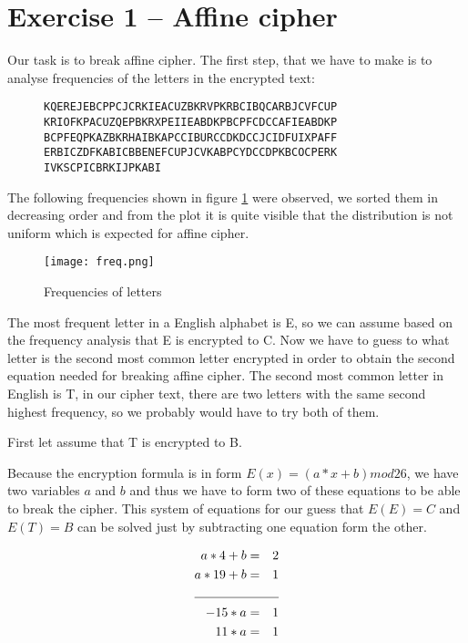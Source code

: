 \documentclass[a4paper,10pt]{article}
\begin{document}
\section*{Exercise 1 -- Affine cipher}
Our task is to break affine cipher. The first step, that we have to make is to analyse frequencies of the letters in the encrypted text:
\begin{figure}[h]
\centering
\begin{BVerbatim}
KQEREJEBCPPCJCRKIEACUZBKRVPKRBCIBQCARBJCVFCUP
KRIOFKPACUZQEPBKRXPEIIEABDKPBCPFCDCCAFIEABDKP
BCPFEQPKAZBKRHAIBKAPCCIBURCCDKDCCJCIDFUIXPAFF
ERBICZDFKABICBBENEFCUPJCVKABPCYDCCDPKBCOCPERK
IVKSCPICBRKIJPKABI
\end{BVerbatim}
\end{figure}

\noindent
The following frequencies shown in figure \ref{fig:freq} were observed, we sorted them in decreasing order and from the plot it is quite visible that the distribution is not uniform which is expected for affine cipher.

\begin{figure}[h]
\centering
\texttt{[image: freq.png]}
\caption{Frequencies of letters}
\label{fig:freq}
\end{figure}

\noindent
The most frequent letter in a English alphabet is E, so we can assume based on the frequency analysis that E is encrypted to C.
Now we have to guess to what letter is the second most common letter encrypted in order to obtain the second equation needed for breaking affine cipher. The second most common letter in English is T, in our cipher text, there are two letters with the same second highest frequency, so we probably would have to try both of them.

\bigskip
\noindent
First let assume that T is encrypted to B.

\bigskip
\noindent
Because the encryption formula is in form $E(x) = (a*x + b) mod 26$, we have two variables $a$ and $b$ and thus we have to form two of these equations to be able to break the cipher. This system of equations for our guess that $E(E) = C$ and $E(T) = B$ can be solved just by subtracting one equation form the other.

\begin{eqnarray*}
a * 4 + b &=& 2\\
a * 19 + b &=& 1\\
\cline{1-3}
-15*a &=& 1 \\
11*a &=& 1
\end{eqnarray*}
\end{document}
